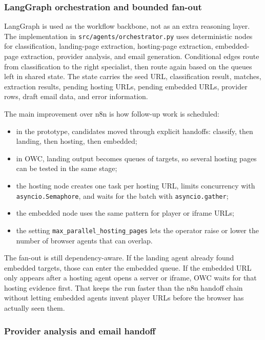 \subsubsection{LangGraph orchestration and bounded fan-out}

LangGraph is used as the workflow backbone, not as an extra reasoning layer. The
implementation in \texttt{src/agents/orchestrator.py} uses deterministic nodes for
classification, landing-page extraction, hosting-page extraction, embedded-page
extraction, provider analysis, and email generation. Conditional edges route from
classification to the right specialist, then route again based on the queues left in
shared state. The state carries the seed URL, classification result, matches, extraction
results, pending hosting URLs, pending embedded URLs, provider rows, draft email data,
and error information.

The main improvement over n8n is how follow-up work is scheduled:
\begin{itemize}
  \raggedright
  \item in the prototype, candidates moved through explicit handoffs: classify, then
  landing, then hosting, then embedded;
  \item in OWC, landing output becomes queues of targets, so several hosting pages can be
  tested in the same stage;
  \item the hosting node creates one task per hosting URL, limits concurrency with
  \texttt{asyncio.Semaphore}, and waits for the batch with \texttt{asyncio.gather};
  \item the embedded node uses the same pattern for player or iframe URLs;
  \item the setting \texttt{max\_parallel\_hosting\_pages} lets the operator raise or
  lower the number of browser agents that can overlap.
\end{itemize}

The fan-out is still dependency-aware. If the landing agent already found embedded
targets, those can enter the embedded queue. If the embedded URL only appears after a
hosting agent opens a server or iframe, OWC waits for that hosting evidence first. That
keeps the run faster than the n8n handoff chain without letting embedded agents invent player
URLs before the browser has actually seen them.



\subsubsection{Provider analysis and email handoff}

